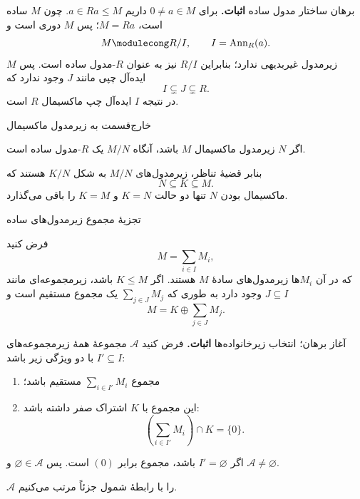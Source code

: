 \begin{frame}[t]{برهان ساختار مدول ساده}
    \label{lec05:simple-classification-proof}
    \textbf{اثبات.} برای $0\neq a\in M$ داریم $a\in Ra\leq M$.
    چون $M$ ساده است، $M=Ra$؛ پس $M$ دوری است و
    \[
        M\modulecong R/I,
        \qquad I=\operatorname{Ann}_R(a).
    \]
    $M$ زیرمدول غیربدیهی ندارد؛ بنابراین $R/I$ نیز به عنوان $R$-مدول ساده است.
    پس ایده‌آل چپی مانند $J$ وجود ندارد که
    \[
        I\subsetneq J\subsetneq R.
    \]
    در نتیجه $I$ ایده‌آل چپ ماکسیمال $R$ است.
\end{frame}

\begin{frame}[t]{خارج‌قسمت به زیرمدول ماکسیمال}
    \label{lec05:maximal-quotient-simple}
    \begin{remark}
        اگر $N$ زیرمدول ماکسیمال $M$ باشد، آنگاه $M/N$
        یک $R$-مدول ساده است.
    \end{remark}
    بنابر قضیهٔ تناظر، زیرمدول‌های $M/N$ به شکل $K/N$ هستند که
    \[
        N\subseteq K\subseteq M.
    \]
    ماکسیمال بودن $N$ تنها دو حالت $K=N$ و $K=M$ را باقی می‌گذارد.
\end{frame}

\begin{frame}[t]{تجزیهٔ مجموع زیرمدول‌های ساده}
    \label{lec05:simple-sum-complement}
    \begin{theorem}
        فرض کنید
        \[
            M=\sum_{i\in I}M_i,
        \]
        که در آن $M_i$ها زیرمدول‌های سادهٔ $M$ هستند.
        اگر $K\leq M$ باشد، زیرمجموعه‌ای مانند $J\subseteq I$ وجود دارد
        به طوری که $\sum_{j\in J}M_j$ یک مجموع مستقیم است و
        \[
            M=K\oplus\sum_{j\in J}M_j.
        \]
    \end{theorem}
\end{frame}

\begin{frame}[t]{آغاز برهان؛ انتخاب زیرخانواده‌ها}
    \label{lec05:complement-poset}
    \textbf{اثبات.} فرض کنید $\mathcal{A}$ مجموعهٔ همهٔ زیرمجموعه‌های
    $I'\subseteq I$ با دو ویژگی زیر باشد:
    \begin{enumerate}
        \item مجموع $\sum_{i\in I'}M_i$ مستقیم باشد؛
        \item این مجموع با $K$ اشتراک صفر داشته باشد:
        \[
            \left(\sum_{i\in I'}M_i\right)\cap K=\{0\}.
        \]
    \end{enumerate}
    اگر $I'=\varnothing$ باشد، مجموع برابر $(0)$ است.
    پس $\varnothing\in\mathcal{A}$ و $\mathcal{A}\neq\varnothing$.

    $\mathcal{A}$ را با رابطهٔ شمول جزئاً مرتب می‌کنیم.
\end{frame}

